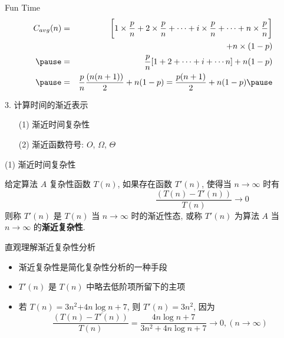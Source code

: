\documentclass[fontset=fandol,UTF8,12pt,aspectratio=169,fleqn]{beamer}
\begin{document}
\begin{frame}{Fun Time}
 \begin{eqnarray*}
   C_{avg}(n)& = & \bigg[ 1\times \frac{p}{n}+2\times \frac{p}{n} + \cdots + i\times \frac{p}{n}+\cdots +
   n\times \frac{p}{n}\bigg ] \\ 
 & & + n\times (1-p)  \\ \pause
 & = & \frac{p}{n}[1+2+\cdots +i+\cdots n]+n(1-p)   \\ \pause
 & = & \frac{p}{n} \frac{(n(n+1))}{2}+n(1-p)=\frac{p(n+1)}{2}+n(1-p)  \pause
 \end{eqnarray*}
\end{frame}

\begin{frame}{3. 计算时间的渐近表示}
\begin{itemize}[<+-|alert@+>]
\item[(1)] 渐近时间复杂性  
\item[(2)] 渐近函数符号: $O$, $\Omega$, $\Theta$  
\end{itemize}
\end{frame}

\begin{frame}{(1) 渐近时间复杂性}
\begin{definition}给定算法 $A$ 复杂性函数 $T(n)$, 如果存在函数 $T'(n)$, 使得当 $n\to \infty$
  时有
  \begin{equation*}
      \hspace{5cm}  \frac{(T(n)-T'(n))}{T(n)} \to 0
      \end{equation*}
      则称 $T'(n)$ 是 $T(n)$ 当 $n\to \infty$ 时的渐近性态, 或称 $T'(n)$ 为算法
$A$ 当 $n\to \infty$ 的\textbf{渐近复杂性}.
\end{definition}
\end{frame}

\begin{frame}{直观理解渐近复杂性分析}
\begin{itemize}[<+-|alert@+>]
\item 渐近复杂性是简化复杂性分析的一种手段  
\item $T'(n)$ 是 $T(n)$ 中略去低阶项所留下的主项  
\item 若 $T(n) = 3n^2\underline{+4n\log n+7}$, 则 $T'(n) = 3n^2$, 因为  
\begin{displaymath}
\frac{(T(n)-T'(n))}{T(n)} = \frac{4n\log n+7}{3n^2+4n\log n+7} \to 0, (n\to
  \infty)  
\end{displaymath}
\end{itemize}
\end{frame}
\end{document}
